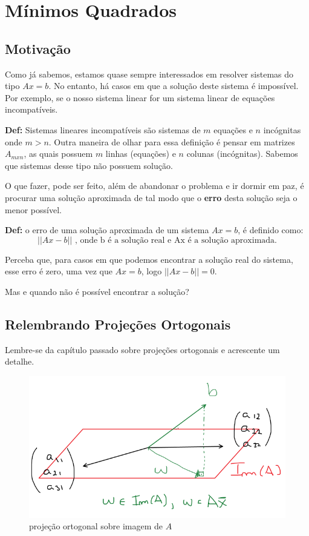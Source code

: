 \documentclass[12pt]{article}
\begin{document}
\section{Mínimos Quadrados}

\subsection{Motivação}

Como já sabemos, estamos quase sempre interessados em resolver sistemas do tipo $Ax=b$. No entanto, há casos em que a solução deste sistema é impossível. Por exemplo, se o nosso sistema linear for um sistema linear de equações incompatíveis.

\textbf{Def:} Sistemas lineares incompatíveis são sistemas de $m$ equações e $n$ incógnitas onde $m>n$. Outra maneira de olhar para essa definição é pensar em matrizes $A_{mxn}$, as quais possuem $m$ linhas (equações) e $n$ colunas (incógnitas). Sabemos que sistemas desse tipo não possuem solução.

O que fazer, pode ser feito, além de abandonar o problema e ir dormir em paz, é procurar uma solução aproximada de tal modo que o \textbf{erro} desta solução seja o menor possível. 

\textbf{Def:} o erro de uma solução aproximada de um sistema $Ax=b$, é definido como:
\begin{equation*}
	||Ax-b|| \mbox{ , onde b é a solução real e Ax é a solução aproximada.}
\end{equation*}

Perceba que, para casos em que podemos encontrar a solução real do sistema, esse erro é zero, uma vez que $Ax=b$, logo $||Ax-b||=0$.

Mas e quando não é possível encontrar a solução?

\subsection{Relembrando Projeções Ortogonais}

Lembre-se da capítulo passado sobre projeções ortogonais e acrescente um detalhe.

\begin{figure}[H]
	\centering
	\includegraphics[width=0.4\linewidth]{Imagens/projOrtogEsp}
	\caption{projeção ortogonal sobre imagem de $A$}
	\label{fig:projortogesp}
\end{figure}
\end{document}
